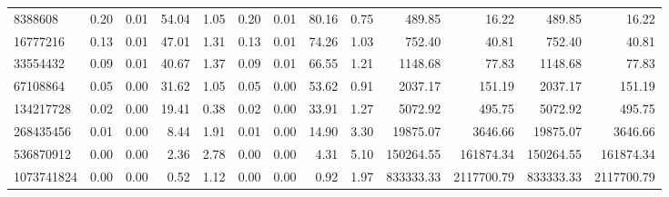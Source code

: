 \begin{tabular}{lrrrrrrrrrrrr}
8388608 & 0.20 & 0.01 & 54.04 & 1.05 & 0.20 & 0.01 & 80.16 & 0.75 & 489.85 & 16.22 & 489.85 & 16.22 \\
16777216 & 0.13 & 0.01 & 47.01 & 1.31 & 0.13 & 0.01 & 74.26 & 1.03 & 752.40 & 40.81 & 752.40 & 40.81 \\
33554432 & 0.09 & 0.01 & 40.67 & 1.37 & 0.09 & 0.01 & 66.55 & 1.21 & 1148.68 & 77.83 & 1148.68 & 77.83 \\
67108864 & 0.05 & 0.00 & 31.62 & 1.05 & 0.05 & 0.00 & 53.62 & 0.91 & 2037.17 & 151.19 & 2037.17 & 151.19 \\
134217728 & 0.02 & 0.00 & 19.41 & 0.38 & 0.02 & 0.00 & 33.91 & 1.27 & 5072.92 & 495.75 & 5072.92 & 495.75 \\
268435456 & 0.01 & 0.00 & 8.44 & 1.91 & 0.01 & 0.00 & 14.90 & 3.30 & 19875.07 & 3646.66 & 19875.07 & 3646.66 \\
536870912 & 0.00 & 0.00 & 2.36 & 2.78 & 0.00 & 0.00 & 4.31 & 5.10 & 150264.55 & 161874.34 & 150264.55 & 161874.34 \\
1073741824 & 0.00 & 0.00 & 0.52 & 1.12 & 0.00 & 0.00 & 0.92 & 1.97 & 833333.33 & 2117700.79 & 833333.33 & 2117700.79 \\
\bottomrule
\end{tabular}
